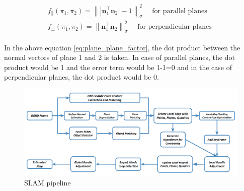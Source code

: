 \documentclass{article}
\begin{document}
\begin{itemize}
\begin{equation}
{
\begin{aligned}
\begin{gathered}
f_{\|}\left(\pi_{1}, \pi_{2}\right)=\left\|\left|\mathbf{n}_{1}^{\top} \mathbf{n}_{2}\right|-1\right\|_{\sigma}^{2} \quad \text { for parallel planes } \\
f_{\perp}\left(\pi_{1}, \pi_{2}\right)=\left\|\mathbf{n}_{1}^{\top} \mathbf{n}_{2}\right\|_{\sigma}^{2} \quad \text { for perpendicular planes }
\end{gathered}
\end{aligned}
} \label{eq:plane_plane_factor}
\end{equation}

In the above equation \ref{eq:plane_plane_factor}, the dot product between the normal vectors of plane 1 and 2 is taken. In case of parallel planes, the dot product would be 1 and the error term would be 1-1=0 and in the case of perpendicular planes, the dot product would be 0.

\begin{figure}[H]
\centering
\includegraphics[width=\textwidth] {Images/slam_pipeline.png}
\caption{\centering SLAM pipeline \cite{StructureAS}}
\label{fig:slam_pipeline.png}
\end{figure}


\end{itemize}
\end{document}
